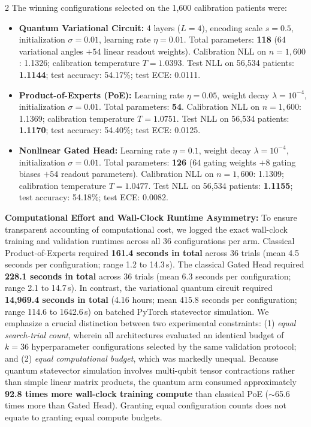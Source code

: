 \documentclass[10pt,a4paper,twoside]{article}
\begin{document}
\begin{multicols}{2}
The winning configurations selected on the 1,600 calibration patients were:
\begin{itemize}
  \setlength{\itemsep}{1pt}
  \item \textbf{Quantum Variational Circuit:} 4 layers ($L=4$), encoding scale $s=0.5$, initialization $\sigma=0.01$, learning rate $\eta=0.01$. Total parameters: \textbf{118} ($64$ variational angles $+ 54$ linear readout weights). Calibration NLL on $n=1,600$: 1.1326; calibration temperature $T = 1.0393$. Test NLL on 56,534 patients: \textbf{1.1144}; test accuracy: 54.17\%; test ECE: 0.0111.
  \item \textbf{Product-of-Experts (PoE):} Learning rate $\eta=0.05$, weight decay $\lambda=10^{-4}$, initialization $\sigma=0.01$. Total parameters: \textbf{54}. Calibration NLL on $n=1,600$: 1.1369; calibration temperature $T = 1.0751$. Test NLL on 56,534 patients: \textbf{1.1170}; test accuracy: 54.40\%; test ECE: 0.0125.
  \item \textbf{Nonlinear Gated Head:} Learning rate $\eta=0.1$, weight decay $\lambda=10^{-4}$, initialization $\sigma=0.01$. Total parameters: \textbf{126} ($64$ gating weights $+ 8$ gating biases $+ 54$ readout parameters). Calibration NLL on $n=1,600$: 1.1309; calibration temperature $T = 1.0477$. Test NLL on 56,534 patients: \textbf{1.1155}; test accuracy: 54.18\%; test ECE: 0.0082.
\end{itemize}

\noindent\textbf{Computational Effort and Wall-Clock Runtime Asymmetry:} To ensure transparent accounting of computational cost, we logged the exact wall-clock training and validation runtimes across all 36 configurations per arm. Classical Product-of-Experts required \textbf{161.4 seconds in total} across 36 trials (mean 4.5 seconds per configuration; range 1.2 to 14.3\,s). The classical Gated Head required \textbf{228.1 seconds in total} across 36 trials (mean 6.3 seconds per configuration; range 2.1 to 14.7\,s). In contrast, the variational quantum circuit required \textbf{14,969.4 seconds in total} (4.16 hours; mean 415.8 seconds per configuration; range 114.6 to 1642.6\,s) on batched PyTorch statevector simulation. We emphasize a crucial distinction between two experimental constraints: (1) \textit{equal search-trial count}, wherein all architectures evaluated an identical budget of $k = 36$ hyperparameter configurations selected by the same validation protocol; and (2) \textit{equal computational budget}, which was markedly unequal. Because quantum statevector simulation involves multi-qubit tensor contractions rather than simple linear matrix products, the quantum arm consumed approximately \textbf{92.8 times more wall-clock training compute} than classical PoE ($\sim$65.6 times more than Gated Head). Granting equal configuration counts does not equate to granting equal compute budgets.


\end{multicols}
\end{document}
